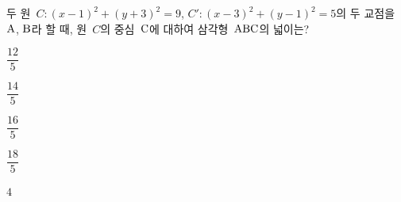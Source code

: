 두 원~$C:(x-1)^2+(y+3)^2=9$, $C':(x-3)^2+(y-1)^2=5$의 두 교점을 $\mathrm{A}$, $\mathrm{B}$라 할 때, 원~$C$의 중심~$\mathrm{C}$에 대하여 삼각형~$\mathrm{ABC}$의 넓이는?
\begin{choices32}{\rule[-3ex]{0pt}{8ex}$\dfrac{12}{5}$}{\rule[-3ex]{0pt}{8ex}$\dfrac{14}{5}$}{\rule[-3ex]{0pt}{8ex}$\dfrac{16}{5}$}{\rule[-3ex]{0pt}{8ex}$\dfrac{18}{5}$}{\rule[-3ex]{0pt}{8ex}$4$}\end{choices32}
